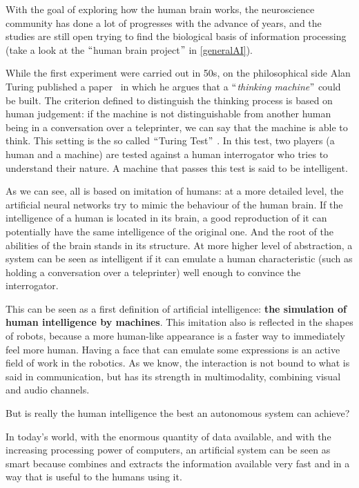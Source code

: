 With the goal of exploring how the human brain works, the neuroscience community has done a lot of progresses with the advance of years, and the studies are still open trying to find the biological basis of information processing (take a look at the $``$human brain project$"$  in \ref{generalAI}).

While the first experiment were carried out in 50s, on the philosophical side Alan Turing published a paper~\cite{turing1950computing} in which he argues that a $``$\textit{thinking machine}$"$  could be built. The criterion defined to distinguish the thinking process is based on human judgement: if the machine is not distinguishable from another human being in a conversation over a teleprinter, we can say that the machine is able to think. This setting is the so called $``$Turing Test$"$ . In this test, two players (a human and a machine) are tested against a human interrogator who tries to understand their nature. A machine that passes this test is said to be intelligent.

As we can see, all is based on imitation of humans: at a more detailed level, the artificial neural networks try to mimic the behaviour of the human brain. If the intelligence of a human is located in its brain, a good reproduction of it can potentially have the same intelligence of the original one. And the root of the abilities of the brain stands in its structure. At more higher level of abstraction, a system can be seen as intelligent if it can emulate a human characteristic (such as holding a conversation over a teleprinter) well enough to convince the interrogator.

This can be seen as a first definition of artificial intelligence: \textbf{the simulation of human intelligence by machines}. This imitation also is reflected in the shapes of robots, because a more human-like appearance is a faster way to immediately feel more human. Having a face that can emulate some expressions is an active field of work in the robotics. As we know, the interaction is not bound to what is said in communication, but has its strength in multimodality, combining visual and audio channels.

But is really the human intelligence the best an autonomous system can achieve? 

In today's world, with the enormous quantity of data available, and with the increasing processing power of computers, an artificial system can be seen as smart because combines and extracts the information available very fast and in a way that is useful to the humans using it.

